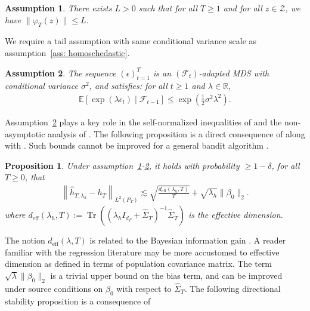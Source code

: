 \documentclass[11pt]{article}
\newtheorem{prop}{Proposition}
\newtheorem{assum}{Assumption}
\DeclareMathOperator{\Tr}{Tr}
\begin{document}
\begin{assum}
\label{ass: bounded_features}
    There exists $L>0$ such that for all $T\geq 1$ and for all $z\in \mathcal{Z}$, we have $\|\varphi_T(z)\|\leq L$. 
\end{assum}
We require a tail assumption with same conditional variance scale as assumption~\ref{ass: homoschedastic}. 
\begin{assum}
    \label{ass: sub_gaussian_noise}
    The sequence $(\epsilon)_{t=1}^{T}$ is an $(\mathcal{F}_t)$-adapted MDS with conditional variance $\sigma^2$, and satisfies: for all $t\geq 1$ and $\lambda \in \mathbb{R}$, 
    \begin{align*}
        \mathbb{E}[\exp(\lambda \epsilon_t)\mid \mathcal{F}_{t-1}] \leq \exp\left(\frac{1}{2}\sigma^2\lambda^2\right).
    \end{align*}
\end{assum}
Assumption~\ref{ass: sub_gaussian_noise} plays a key role in the self-normalized inequalities of \citet{NIPS2011_e1d5be1c} and the non-asymptotic analysis of \citet{fan2025statisticalinferenceadaptivesampling}. The following proposition is a direct consequence of \citep[Theorem 2]{NIPS2011_e1d5be1c} along with \citep[Proposition 2]{jezequel2019}. Such bounds cannot be improved for a general bandit algorithm \citep{pmlr-v195-lattimore23b}. 
\begin{prop}
Under assumption~\ref{ass: bounded_features}-\ref{ass: sub_gaussian_noise}, it holds with probability $\geq 1-\delta$, for all $T\geq 0$, that
    \begin{align*}
        \left\|\widehat h_{T,\lambda_h} - h_T\right\|_{L^2(P_T)} \lesssim \sqrt{\frac{ d_{\mathrm{eff}}(\lambda_h, T)}{T}} + \sqrt{\lambda_h} \| \beta_0 \|_2.
    \end{align*}
    where $d_{\mathrm{eff}}(\lambda_h, T) :=  \Tr\left((\lambda_h I_{d_T}+ \widehat \Sigma_T)^{-1} \widehat \Sigma_T\right)$ is the effective dimension.
\end{prop}
The notion $d_{\mathrm{eff}}(\lambda, T)$ is related to the Bayesian information gain \citep{krause2010}. A reader familiar with the regression literature \citep{caponnetto2007optimal, fischer2020sobolev} may be more accustomed to effective dimension as defined in terms of population covariance matrix. The term $\sqrt{\lambda} \| \beta_0 \|_2$ is a trivial upper bound on the bias term, and can be improved under source conditions on $\beta_0$ with respect to $\widehat{\Sigma}_T$. The following directional stability proposition is a consequence of
\end{document}
